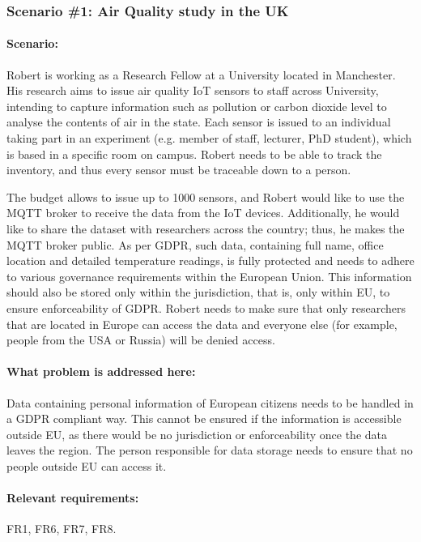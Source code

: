 \subsubsection{Scenario \#1: Air Quality study in the UK}
\paragraph{\textbf{Scenario:}}
Robert is working as a Research Fellow at a University located in Manchester. His research aims to issue air quality IoT sensors to staff across University, intending to capture information such as pollution or carbon dioxide level to analyse the contents of air in the state. Each sensor is issued to an individual taking part in an experiment (e.g. member of staff, lecturer, PhD student), which is based in a specific room on campus. Robert needs to be able to track the inventory, and thus every sensor must be traceable down to a person.

The budget allows to issue up to 1000 sensors, and Robert would like to use the MQTT broker to receive the data from the IoT devices. Additionally, he would like to share the dataset with researchers across the country; thus, he makes the MQTT broker public. As per GDPR, such data, containing full name, office location and detailed temperature readings, is fully protected and needs to adhere to various governance requirements within the European Union. This information should also be stored only within the jurisdiction, that is, only within EU, to ensure enforceability of GDPR. Robert needs to make sure that only researchers that are located in Europe can access the data and everyone else (for example, people from the USA or Russia) will be denied access.

\paragraph{\textbf{What problem is addressed here:}}
Data containing personal information of European citizens needs to be handled in a GDPR compliant way. This cannot be ensured if the information is accessible outside EU, as there would be no jurisdiction or enforceability once the data leaves the region. The person responsible for data storage needs to ensure that no people outside EU can access it.
\paragraph{\textbf{Relevant requirements:}} FR1, FR6, FR7, FR8.
\\
